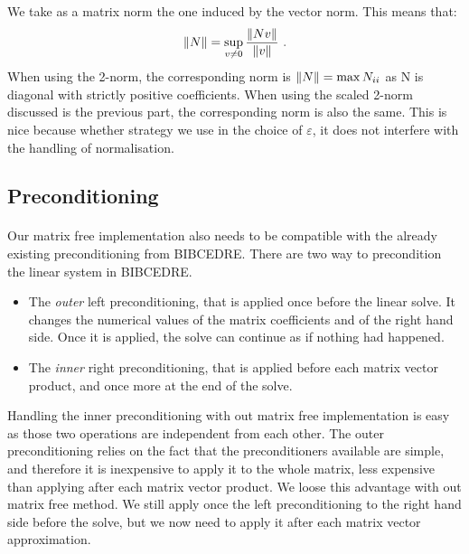       We take as a matrix norm the one induced by the vector norm.
      This means that:
      \begin{equation}
        \norm{N} = \sup_{v \ne 0} \frac{\norm{Nv}}{\norm{v}} \ .
      \end{equation}
      When using the 2-norm, the corresponding norm is $\norm{N} = \max{N_{ii}}$ as N is diagonal with strictly positive coefficients.
      When using the scaled 2-norm discussed is the previous part, the corresponding norm is also the same.
      This is nice because whether strategy we use in the choice of $\varepsilon$, it does not interfere with the handling of normalisation.


    \subsection{Preconditioning}

      \paragraph{}
      Our matrix free implementation also needs to be compatible with the already existing preconditioning from BIBCEDRE.
      There are two way to precondition the linear system in BIBCEDRE.
      \begin{itemize}
        \item The \emph{outer} left preconditioning, that is applied once before the linear solve.
          It changes the numerical values of the matrix coefficients and of the right hand side.
          Once it is applied, the solve can continue as if nothing had happened.
        \item The \emph{inner} right preconditioning, that is applied before each matrix vector product, and once more at the end of the solve.
      \end{itemize}
      Handling the inner preconditioning with out matrix free implementation is easy as those two operations are independent from each other.
      The outer preconditioning relies on the fact that the preconditioners available are simple, and therefore it is inexpensive to apply it to the whole matrix, less expensive than applying after each matrix vector product.
      We loose this advantage with out matrix free method.
      We still apply once the left preconditioning to the right hand side before the solve, but we now need to apply it after each matrix vector approximation.


